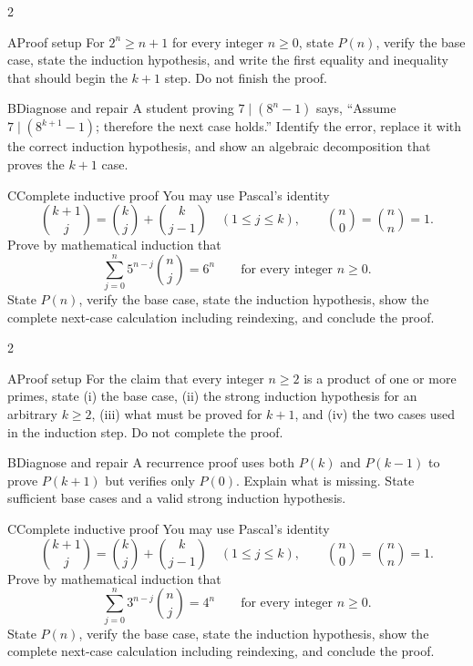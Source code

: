 \documentclass[9pt]{extarticle}
\begin{document}
\CoreWorkArea
\FormBreak
{}
\begin{multicols}{2}
\begin{CompactCoreProblem}{A}{Proof setup}
For $2^n\ge n+1$ for every integer $n\ge0$, state $P(n)$, verify the base case, state the induction hypothesis, and write the first equality and inequality that should begin the $k+1$ step. Do not finish the proof.
\end{CompactCoreProblem}
\begin{CompactCoreProblem}{B}{Diagnose and repair}
A student proving $7\mid(8^n-1)$ says, “Assume $7\mid(8^{k+1}-1)$; therefore the next case holds.” Identify the error, replace it with the correct induction hypothesis, and show an algebraic decomposition that proves the $k+1$ case.
\end{CompactCoreProblem}
\end{multicols}
\begin{CompactCoreProblem}{C}{Complete inductive proof}
You may use Pascal's identity
\[
\binom{k+1}{j}=\binom{k}{j}+\binom{k}{j-1}
\quad(1\le j\le k),\qquad
\binom{n}{0}=\binom{n}{n}=1.
\]
Prove by mathematical induction that
\[
\sum_{j=0}^{n} 5^{n-j}\binom{n}{j}=6^n\qquad\text{for every integer }n\ge0.
\]
State $P(n)$, verify the base case, state the induction hypothesis, show the complete next-case calculation including reindexing, and conclude the proof.
\end{CompactCoreProblem}
\CoreWorkArea
\FormBreak
{}
\begin{multicols}{2}
\begin{CompactCoreProblem}{A}{Proof setup}
For the claim that every integer $n\ge2$ is a product of one or more primes, state (i) the base case, (ii) the strong induction hypothesis for an arbitrary $k\ge2$, (iii) what must be proved for $k+1$, and (iv) the two cases used in the induction step. Do not complete the proof.
\end{CompactCoreProblem}
\begin{CompactCoreProblem}{B}{Diagnose and repair}
A recurrence proof uses both $P(k)$ and $P(k-1)$ to prove $P(k+1)$ but verifies only $P(0)$. Explain what is missing. State sufficient base cases and a valid strong induction hypothesis.
\end{CompactCoreProblem}
\end{multicols}
\begin{CompactCoreProblem}{C}{Complete inductive proof}
You may use Pascal's identity
\[
\binom{k+1}{j}=\binom{k}{j}+\binom{k}{j-1}
\quad(1\le j\le k),\qquad
\binom{n}{0}=\binom{n}{n}=1.
\]
Prove by mathematical induction that
\[
\sum_{j=0}^{n} 3^{n-j}\binom{n}{j}=4^n\qquad\text{for every integer }n\ge0.
\]
State $P(n)$, verify the base case, state the induction hypothesis, show the complete next-case calculation including reindexing, and conclude the proof.
\end{CompactCoreProblem}
\end{document}
